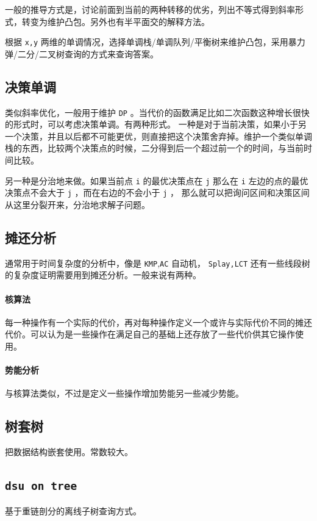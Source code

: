 \documentclass[UTF-8]{ctexart}
\begin{document}
一般的推导方式是，讨论前面到当前的两种转移的优劣，列出不等式得到斜率形式，转变为维护凸包。另外也有半平面交的解释方法。

根据 \texttt{x,y} 两维的单调情况，选择单调栈/单调队列/平衡树来维护凸包，采用暴力弹/二分/二叉树查询的方式来查询答案。

\subsection{决策单调}
类似斜率优化，一般用于维护 \texttt{DP} 。当代价的函数满足比如二次函数这种增长很快的形式时，可以考虑决策单调。有两种形式。
一种是对于当前决策，如果小于另一个决策，并且以后都不可能更优，则直接把这个决策舍弃掉。维护一个类似单调栈的东西，比较两个决策点的时候，二分得到后一个超过前一个的时间，与当前时间比较。

另一种是分治地来做。如果当前点 \texttt{i} 的最优决策点在 \texttt{j} 那么在 \texttt{i} 左边的点的最优决策点不会大于 \texttt{j} ，而在右边的不会小于 \texttt{j} ， 那么就可以把询问区间和决策区间从这里分裂开来，分治地求解子问题。

\subsection{摊还分析}
通常用于时间复杂度的分析中，像是 \texttt{KMP},\texttt{AC} 自动机， \texttt{Splay,LCT} 还有一些线段树的复杂度证明需要用到摊还分析。一般来说有两种。

\paragraph{核算法} 每一种操作有一个实际的代价，再对每种操作定义一个或许与实际代价不同的摊还代价。可以认为是一些操作在满足自己的基础上还存放了一些代价供其它操作使用。

\paragraph{势能分析} 与核算法类似，不过是定义一些操作增加势能另一些减少势能。

\subsection{树套树}
把数据结构嵌套使用。常数较大。

\subsection{\texttt{dsu on tree}}
基于重链剖分的离线子树查询方式。
\end{document}
